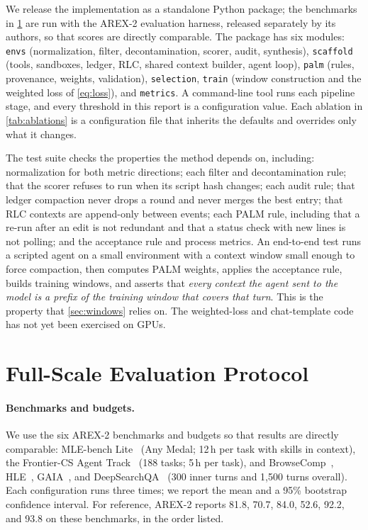 \documentclass[11pt]{article}
\newcommand{\code}[1]{\texttt{#1}}
\begin{document}

We release the implementation as a standalone Python package; the benchmarks in \cref{sec:protocol} are run with the AREX-2 evaluation harness, released separately by its authors, so that scores are directly comparable. The package has six modules: \code{envs} (normalization, filter, decontamination, scorer, audit, synthesis), \code{scaffold} (tools, sandboxes, ledger, RLC, shared context builder, agent loop), \code{palm} (rules, provenance, weights, validation), \code{selection}, \code{train} (window construction and the weighted loss of \cref{eq:loss}), and \code{metrics}. A command-line tool runs each pipeline stage, and every threshold in this report is a configuration value. Each ablation in \cref{tab:ablations} is a configuration file that inherits the defaults and overrides only what it changes.

The test suite checks the properties the method depends on, including: normalization for both metric directions; each filter and decontamination rule; that the scorer refuses to run when its script hash changes; each audit rule; that ledger compaction never drops a round and never merges the best entry; that RLC contexts are append-only between events; each PALM rule, including that a re-run after an edit is not redundant and that a status check with new lines is not polling; and the acceptance rule and process metrics. An end-to-end test runs a scripted agent on a small environment with a context window small enough to force compaction, then computes PALM weights, applies the acceptance rule, builds training windows, and asserts that \emph{every context the agent sent to the model is a prefix of the training window that covers that turn}. This is the property that \cref{sec:windows} relies on. The weighted-loss and chat-template code has not yet been exercised on GPUs.

\section{Full-Scale Evaluation Protocol}
\label{sec:protocol}

\paragraph{Benchmarks and budgets.}
We use the six AREX-2 benchmarks and budgets so that results are directly comparable: MLE-bench Lite~\citep{chan2025mlebench} (Any Medal; 12\,h per task with skills in context), the Frontier-CS Agent Track~\citep{mang2025frontiercs} (188 tasks; 5\,h per task), and BrowseComp~\citep{wei2025browsecomp}, HLE~\citep{phan2025hle}, GAIA~\citep{mialon2023gaia}, and DeepSearchQA~\citep{gupta2026deepsearchqa} (300 inner turns and 1{,}500 turns overall). Each configuration runs three times; we report the mean and a 95\% bootstrap confidence interval. For reference, AREX-2 reports 81.8, 70.7, 84.0, 52.6, 92.2, and 93.8 on these benchmarks, in the order listed.
\end{document}
